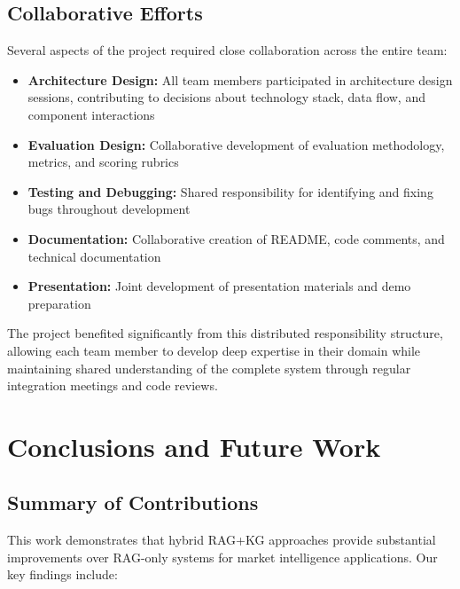 \documentclass[11pt,twocolumn]{article}
\begin{document}
\subsection{Collaborative Efforts}

Several aspects of the project required close collaboration across the entire team:

\begin{itemize}
\item \textbf{Architecture Design:} All team members participated in architecture design sessions, contributing to decisions about technology stack, data flow, and component interactions
\item \textbf{Evaluation Design:} Collaborative development of evaluation methodology, metrics, and scoring rubrics
\item \textbf{Testing and Debugging:} Shared responsibility for identifying and fixing bugs throughout development
\item \textbf{Documentation:} Collaborative creation of README, code comments, and technical documentation
\item \textbf{Presentation:} Joint development of presentation materials and demo preparation
\end{itemize}

The project benefited significantly from this distributed responsibility structure, allowing each team member to develop deep expertise in their domain while maintaining shared understanding of the complete system through regular integration meetings and code reviews.

\section{Conclusions and Future Work}

\subsection{Summary of Contributions}

This work demonstrates that hybrid RAG+KG approaches provide substantial improvements over RAG-only systems for market intelligence applications. Our key findings include:
\end{document}
